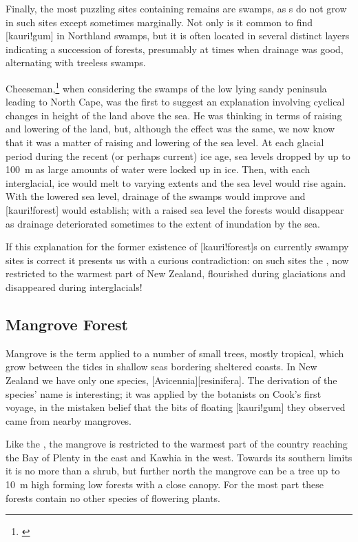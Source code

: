 Finally, the most puzzling sites containing  remains are swamps, as s do not grow in such sites except sometimes marginally.
Not only is it common to find [kauri!gum] in Northland swamps, but it is often located in several distinct layers indicating a succession of forests, presumably at times when drainage was good, alternating with treeless swamps.

Cheeseman,\footnote{\cite{cheeseman1896flora}} when considering the swamps of the low lying sandy peninsula leading to North Cape, was the first to suggest an explanation involving cyclical changes in height of the land above the sea.
He was thinking in terms of raising and lowering of the land, but, although the effect was the same, we now know that it was a matter of raising and lowering of the sea level.
At each glacial period during the recent (or perhaps current) ice age, sea levels dropped by up to \SI{100}{\metre} as large amounts of water were locked up in ice.
Then, with each interglacial, ice would melt to varying extents and the sea level would rise again.
With the lowered sea level, drainage of the swamps would improve and [kauri!forest] would establish; with a raised sea level the forests would disappear as drainage deteriorated sometimes to the extent of inundation by the sea.

If this explanation for the former existence of [kauri!forest]s on currently swampy sites is correct it presents us with a curious contradiction: on such sites the , now restricted to the warmest part of New Zealand, flourished during glaciations and disappeared during interglacials!

\subsection{Mangrove Forest}

Mangrove is the term applied to a number of small trees, mostly tropical, which grow between the tides in shallow seas bordering sheltered coasts.
In New Zealand we have only one species, [Avicennia][resinifera].
The derivation of the species' name is interesting; it was applied by the botanists on Cook's first voyage, in the mistaken belief that the bits of floating [kauri!gum] they observed came from nearby mangroves.

Like the , the mangrove is restricted to the warmest part of the country reaching the Bay of Plenty in the east and Kawhia in the west.
Towards its southern limits it is no more than a shrub, but further north the mangrove can be a tree up to \SI{10}{\metre} high forming low forests with a close canopy.
For the most part these forests contain no other species of flowering plants.

